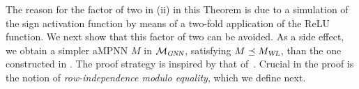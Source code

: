 The reason for the factor of two in (ii) in this Theorem is due to a
simulation of the sign activation function by means of a two-fold application
of the ReLU function. We next show that this factor of two can be avoided. As
a side effect, we obtain a simpler aMPNN $M$ in
$\mathcal{M}_{\textsl{GNN}}$, satisfying $M\preceq M_{\textsl{WL}}$, than
the one constructed in \cite{grohewl}. The proof strategy is inspired by that
of~\cite{grohewl}. Crucial in the proof is the notion of \textit{row-independence modulo equality}, which we define next.

